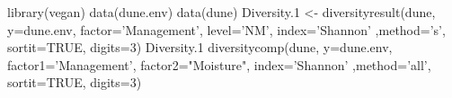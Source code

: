 \begin{Examples}
\begin{ExampleCode}
library(vegan)
data(dune.env)
data(dune)
Diversity.1 <- diversityresult(dune, y=dune.env, factor='Management', 
    level='NM', index='Shannon' ,method='s', sortit=TRUE, digits=3)
Diversity.1
diversitycomp(dune, y=dune.env, factor1='Management', factor2="Moisture", 
    index='Shannon' ,method='all', sortit=TRUE, digits=3)
\end{ExampleCode}
\end{Examples}

